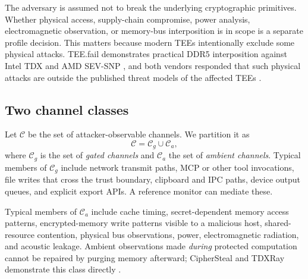 \documentclass[11pt,letterpaper]{article}
\theoremstyle{plain}
\theoremstyle{definition}
\newcommand{\Cg}{\mathcal{C}_g}
\newcommand{\Ca}{\mathcal{C}_a}
\begin{document}
The adversary is assumed not to break the underlying cryptographic primitives. Whether physical access, supply-chain compromise, power analysis, electromagnetic observation, or memory-bus interposition is in scope is a separate profile decision. This matters because modern TEEs intentionally exclude some physical attacks. TEE.fail demonstrates practical DDR5 interposition against Intel TDX and AMD SEV-SNP \cite{teefail}, and both vendors responded that such physical attacks are outside the published threat models of the affected TEEs \cite{intelteefail,amdsb3040}.

\subsection{Two channel classes}
Let $\mathcal{C}$ be the set of attacker-observable channels. We partition it as
\begin{equation}
\mathcal{C} = \Cg \cup \Ca,
\end{equation}
where $\Cg$ is the set of \emph{gated channels} and $\Ca$ the set of \emph{ambient channels}. Typical members of $\Cg$ include network transmit paths, MCP or other tool invocations, file writes that cross the trust boundary, clipboard and IPC paths, device output queues, and explicit export APIs. A reference monitor can mediate these.

Typical members of $\Ca$ include cache timing, secret-dependent memory access patterns, encrypted-memory write patterns visible to a malicious host, shared-resource contention, physical bus observations, power, electromagnetic radiation, and acoustic leakage. Ambient observations made \emph{during} protected computation cannot be repaired by purging memory afterward; CipherSteal and TDXRay demonstrate this class directly \cite{ciphersteal,tdxray}.
\end{document}
